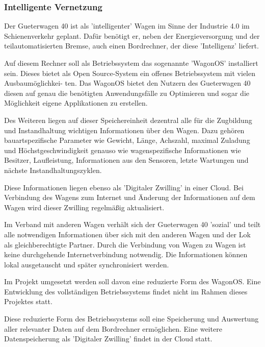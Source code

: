 \subsubsection{Intelligente Vernetzung}
Der \gls{Gueterwagen 40} ist als 'intelligenter' Wagen im Sinne der Industrie 4.0 im Schienenverkehr geplant. Dafür benötigt er, neben der Energieversorgung und der teilautomatisierten Bremse, auch einen Bordrechner, der diese 'Intelligenz' liefert.\par
Auf diesem Rechner soll als Betriebssystem das sogenannte '\gls{WagonOS}' installiert sein. Dieses bietet als Open Source-System ein offenes Betriebssystem mit vielen Ausbaumöglichkei- ten. Das \gls{WagonOS} bietet den Nutzern des \gls{Gueterwagen 40}  diesen auf genau die benötigten Anwendungsfälle zu Optimieren und sogar die Möglichkeit eigene Applikationen zu erstellen.\par
Des Weiteren liegen auf dieser Speichereinheit dezentral alle für die Zugbildung und Instandhaltung wichtigen Informationen über den Wagen. Dazu gehören bauartspezifische Parameter wie Gewicht, Länge, Achszahl, maximal Zuladung und Höchstgeschwindigkeit genauso wie wagenspezifische Informationen wie Besitzer, Laufleistung, Informationen aus den Sensoren, letzte Wartungen und nächste Instandhaltungszyklen.\par
Diese Informationen liegen ebenso als 'Digitaler Zwilling' in einer Cloud. Bei Verbindung des Wagens zum Internet und Änderung der Informationen auf dem Wagen wird dieser Zwilling regelmäßig aktualisiert.\par
Im Verband mit anderen Wagen verhält sich der \gls{Gueterwagen 40} 'sozial' und teilt alle notwendigen Informationen über sich mit den anderen Wagen und der Lok als gleichberechtigte Partner. Durch die Verbindung von Wagen zu Wagen ist keine durchgehende Internetverbindung notwendig. Die Informationen können lokal ausgetauscht und später synchronisiert werden.\par
Im Projekt umgesetzt werden soll davon eine reduzierte Form des \gls{WagonOS}. Eine Entwicklung des vollständigen Betriebssystems findet nicht im Rahmen dieses Projektes statt.\par
Diese reduzierte Form des Betriebssystems soll eine Speicherung und Auswertung aller relevanter Daten auf dem Bordrechner ermöglichen. Eine weitere Datenspeicherung als 'Digitaler Zwilling' findet in der Cloud statt.

